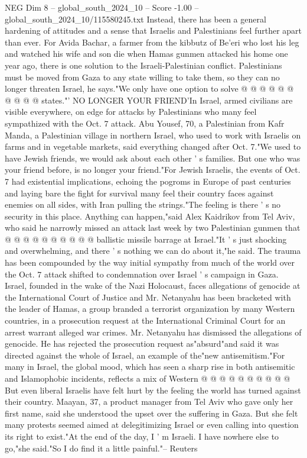 \begin{textsample}{NEG Dim 8 – global\_south\_2024\_10 – Score -1.00 – global\_south\_2024\_10/115580245.txt}
Instead, there has been a general hardening of attitudes and a sense that Israelis and Palestinians feel further apart than ever.
For Avida Bachar, a farmer from the kibbutz of Be'eri who lost his leg and watched his wife and son die when Hamas gunmen attacked his home one year ago, there is one solution to the Israeli-Palestinian conflict.
Palestinians must be moved from Gaza to any state willing to take them, so they can no longer threaten Israel, he says."We only have one option to solve @ @ @ @ @ @ @ @ @ @ states."' NO LONGER YOUR FRIEND'In Israel, armed civilians are visible everywhere, on edge for attacks by Palestinians who many feel sympathized with the Oct. 7 attack.
Abu Yousef, 70, a Palestinian from Kafr Manda, a Palestinian village in northern Israel, who used to work with Israelis on farms and in vegetable markets, said everything changed after Oct. 7."We used to have Jewish friends, we would ask about each other ' s families.
But one who was your friend before, is no longer your friend."For Jewish Israelis, the events of Oct. 7 had existential implications, echoing the pogroms in Europe of past centuries and laying bare the fight for survival many feel their country faces against enemies on all sides, with Iran pulling the strings."The feeling is there ' s no security in this place.
Anything can happen,"said Alex Kaidrikov from Tel Aviv, who said he narrowly missed an attack last week by two Palestinian gunmen that @ @ @ @ @ @ @ @ @ @ ballistic missile barrage at Israel."It ' s just shocking and overwhelming, and there ' s nothing we can do about it,"he said.
The trauma has been compounded by the way initial sympathy from much of the world over the Oct. 7 attack shifted to condemnation over Israel ' s campaign in Gaza.
Israel, founded in the wake of the Nazi Holocaust, faces allegations of genocide at the International Court of Justice and Mr.
Netanyahu has been bracketed with the leader of Hamas, a group branded a terrorist organization by many Western countries, in a prosecution request at the International Criminal Court for an arrest warrant alleged war crimes.
Mr.
Netanyahu has dismissed the allegations of genocide.
He has rejected the prosecution request as"absurd"and said it was directed against the whole of Israel, an example of the"new antisemitism."For many in Israel, the global mood, which has seen a sharp rise in both antisemitic and Islamophobic incidents, reflects a mix of Western @ @ @ @ @ @ @ @ @ @ But even liberal Israelis have felt hurt by the feeling the world has turned against their country.
Maayan, 37, a product manager from Tel Aviv who gave only her first name, said she understood the upset over the suffering in Gaza.
But she felt many protests seemed aimed at delegitimizing Israel or even calling into question its right to exist."At the end of the day, I ' m Israeli.
I have nowhere else to go,"she said."So I do find it a little painful."-- Reuters

\end{textsample}
